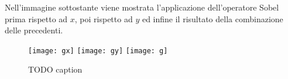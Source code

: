 Nell'immagine sottostante viene mostrata l'applicazione dell'operatore Sobel prima rispetto ad $x$, poi rispetto ad $y$ ed infine il risultato della combinazione delle precedenti.

\begin{figure}[ht] %
  \begin{center}
    \texttt{[image: gx]}
    \texttt{[image: gy]}
    \texttt{[image: g]}
    \caption{TODO caption}
    \label{fig:sobel_example}
  \end{center}
\end{figure}




\clearpage

